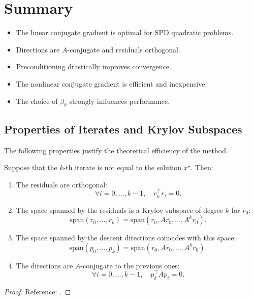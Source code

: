 \section{Summary}

\begin{itemize}
  \item The linear conjugate gradient is optimal for SPD quadratic problems.
  \item Directions are $A$-conjugate and residuals orthogonal.
  \item Preconditioning drastically improves convergence.
  \item The nonlinear conjugate gradient is efficient and inexpensive.
  \item The choice of $\beta_k$ strongly influences performance.
\end{itemize}

\subsection{Properties of Iterates and Krylov Subspaces}

The following properties justify the theoretical efficiency of the method.

\begin{theoreme}
Suppose that the $k$-th iterate is not equal to the solution $x^\star$. Then:
\begin{enumerate}
    \item[(i)] The residuals are orthogonal:
    \[ \forall i = 0, \dots, k-1, \quad r_k^\top r_i = 0. \]
    
    \item[(ii)] The space spanned by the residuals is a Krylov subspace of degree $k$ for $r_0$:
    \[ \mathrm{span}(r_0, \dots, r_k) = \mathrm{span}(r_0, A r_0, \dots, A^k r_0). \]
    
    \item[(iii)] The space spanned by the descent directions coincides with this space:
    \[ \mathrm{span}(p_0, \dots, p_k) = \mathrm{span}(r_0, A r_0, \dots, A^k r_0). \]
    
    \item[(iv)] The directions are $A$-conjugate to the previous ones:
    \[ \forall i = 0, \dots, k-1, \quad p_k^\top A p_i = 0. \]
\end{enumerate}
\end{theoreme}

\begin{proof}[Proof]
Reference: \cite{nocedal2006numerical}.
\end{proof}

